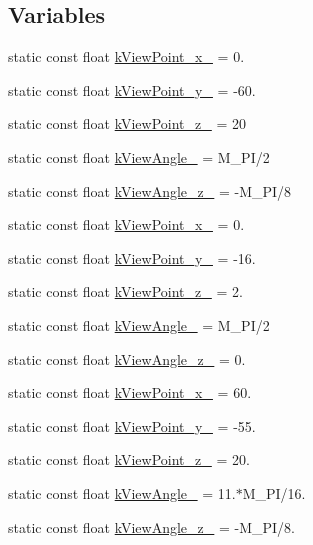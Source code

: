 \subsection*{Variables}
\begin{DoxyCompactItemize}
\item 
static const float \hyperlink{a00186_a2af52f51227fade1fa8e6d66aa763eb0}{k\-View\-Point\-\_\-x\-\_} = 0.
\item 
static const float \hyperlink{a00186_ad7b3835ae2b765cc0a2ae45375185ca3}{k\-View\-Point\-\_\-y\-\_} = -\/60.
\item 
static const float \hyperlink{a00186_a2d9e6998200c6314e45cd8f14f852a42}{k\-View\-Point\-\_\-z\-\_} = 20
\item 
static const float \hyperlink{a00186_a116a11673cf1e70127632b771e279d31}{k\-View\-Angle\-\_} = M\-\_\-\-P\-I/2
\item 
static const float \hyperlink{a00186_a867bb7d5df7bc8cff729ce89c7326a22}{k\-View\-Angle\-\_\-z\-\_} = -\/M\-\_\-\-P\-I/8
\item 
static const float \hyperlink{a00186_a74c9e662a755f04c035d8d4c5184cb6d}{k\-View\-Point\-\_\-x\-\_} = 0.
\item 
static const float \hyperlink{a00186_a16973d586ea7b2c98b1772046fd61431}{k\-View\-Point\-\_\-y\-\_} = -\/16.
\item 
static const float \hyperlink{a00186_af84ee1e2c76e3f5eb8a51e914c587861}{k\-View\-Point\-\_\-z\-\_} = 2.
\item 
static const float \hyperlink{a00186_ad8032f50b7cf909de4b3e2734f38047b}{k\-View\-Angle\-\_} = M\-\_\-\-P\-I/2
\item 
static const float \hyperlink{a00186_ababb374a6f171c239aadfada37830424}{k\-View\-Angle\-\_\-z\-\_} = 0.
\item 
static const float \hyperlink{a00186_af23c99a8f775b785c66d147f0a6ea579}{k\-View\-Point\-\_\-x\-\_} = 60.
\item 
static const float \hyperlink{a00186_a80868fccf9e801168c40bcf130f32794}{k\-View\-Point\-\_\-y\-\_} = -\/55.
\item 
static const float \hyperlink{a00186_ad03f149c2afc08a711c5ab6a5e4b9567}{k\-View\-Point\-\_\-z\-\_} = 20.
\item 
static const float \hyperlink{a00186_a02f58587960368f53b105b6b56869d2e}{k\-View\-Angle\-\_} = 11.$\ast$M\-\_\-\-P\-I/16.
\item 
static const float \hyperlink{a00186_a597fe6f0f926543fe64d51fc1969c7e3}{k\-View\-Angle\-\_\-z\-\_} = -\/M\-\_\-\-P\-I/8.
\end{DoxyCompactItemize}



